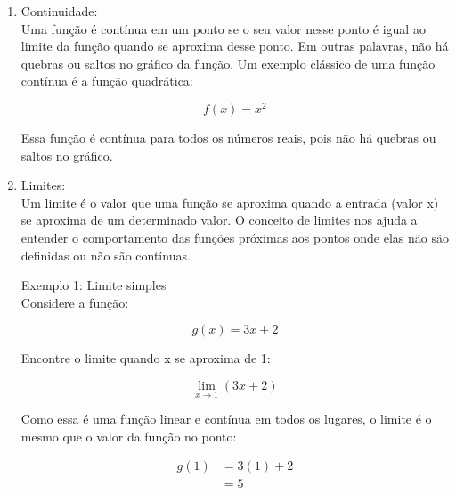 \documentclass[Analysis/analysis_notes.tex]{subfiles}
\begin{document}
\begin{enumerate}
	\item Continuidade: \\
	      Uma função é contínua em um ponto se o seu valor nesse ponto é igual ao limite da função quando se aproxima desse ponto. Em outras palavras, não há quebras ou saltos no gráfico da função. Um exemplo clássico de uma função contínua é a função quadrática:

	      \begin{equation*}
		      f(x) = x^2
	      \end{equation*}

	      Essa função é contínua para todos os números reais, pois não há quebras ou saltos no gráfico.

	      \begin{center}
	      \end{center}

	\item Limites: \\
	      Um limite é o valor que uma função se aproxima quando a entrada (valor x) se aproxima de um determinado valor. O conceito de limites nos ajuda a entender o comportamento das funções próximas aos pontos onde elas não são definidas ou não são contínuas.

	      Exemplo 1: Limite simples \\
	      Considere a função:

	      \begin{equation*}
		      g(x) = 3x + 2
	      \end{equation*}

	      Encontre o limite quando x se aproxima de 1:

	      \begin{equation*}
		      \lim_{x \to 1} (3x + 2)
	      \end{equation*}

	      Como essa é uma função linear e contínua em todos os lugares, o limite é o mesmo que o valor da função no ponto:

	      \begin{align*}
		      g(1) & = 3(1) + 2 \\
		           & = 5
	      \end{align*}


\end{enumerate}
\end{document}
